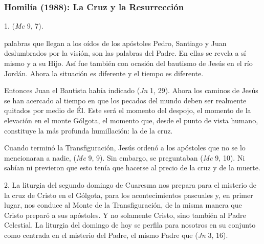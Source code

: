 


\label{b2-03-02-1985H}
\newpage 


\subsubsection{Homilía (1988): La Cruz y la Resurrección}


\begin{body}
1.  (\textit{Mc} 9, 7).


 palabras que llegan a los oídos de los apóstoles Pedro, Santiago y Juan deslumbrados por la visión, son las palabras del Padre. En ellas se revela a sí mismo y a su Hijo. Así fue también con ocasión del bautismo de Jesús en el río Jordán. Ahora la situación es diferente y el tiempo es diferente.

Entonces Juan el Bautista había indicado  (\textit{Jn} 1, 29). Ahora los caminos de Jesús se han acercado al tiempo en que los pecados del mundo deben ser realmente quitados por medio de Él. Este será el momento del despojo, el momento de la elevación en el monte Gólgota, el momento que, desde el punto de vista humano, constituye la más profunda humillación: la  de la cruz.

Cuando terminó la Transfiguración, Jesús ordenó a los apóstoles que no se lo mencionaran a nadie,  (\textit{Mc} 9, 9). Sin embargo, se preguntaban  (\textit{Mc} 9, 10). Ni sabían ni previeron que esto tenía que hacerse al precio de la cruz y de la muerte.

2. La liturgia del segundo domingo de Cuaresma nos prepara para el misterio de la cruz de Cristo en el Gólgota, para los acontecimientos pascuales y, en primer lugar, nos conduce al Monte de la Transfiguración, de la misma manera que Cristo preparó a sus apóstoles. Y no solamente Cristo, sino también al Padre Celestial. La liturgia del domingo de hoy se perfila para nosotros en su conjunto como centrada en el misterio del Padre, el mismo Padre que  (\textit{Jn} 3, 16).


\end{body}
